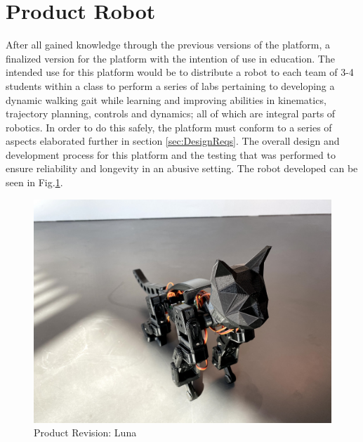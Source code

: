 \documentclass[12pt]{report}
\begin{document}
\section{Product Robot}
After all gained knowledge through the previous versions of the platform, a finalized version for the platform with the intention of use in education. The intended use for this platform would be to distribute a robot to each team of 3-4 students within a class to perform a series of labs pertaining to developing a dynamic walking gait while learning and improving abilities in kinematics, trajectory planning, controls and dynamics; all of which are integral parts of robotics. In order to do this safely, the platform must conform to a series of aspects elaborated further in section \ref{sec:DesignReqs}. The overall design and development process for this platform and the testing that was performed to ensure reliability and longevity in an abusive setting. The robot developed can be seen in Fig.\ref{fig:Luna}.  
\begin{figure}[H]
    \centering
    \includegraphics[width=0.5\textheight]{Images/IMG_0119.jpg}
    \caption{Product Revision: Luna}
    \label{fig:Luna}
\end{figure}
\end{document}
